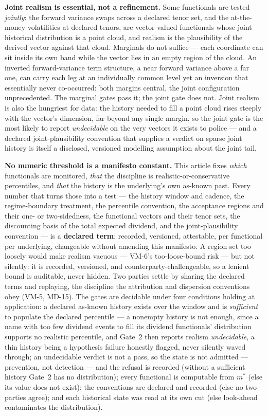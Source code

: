 \documentclass[11pt,a4paper]{article}
\begin{document}
\textbf{Joint realism is essential, not a refinement.} Some functionals are tested
\emph{jointly}: the forward variance swaps across a declared tenor set, and the
at-the-money volatilities at declared tenors, are vector-valued functionals whose
joint historical distribution is a point cloud, and realism is the plausibility of
the derived vector against that cloud. Marginals do not suffice --- each coordinate
can sit inside its own band while the vector lies in an empty region of the cloud.
An inverted forward-variance term structure, a near forward variance above a far
one, can carry each leg at an individually common level yet an inversion that
essentially never co-occurred: both margins central, the joint configuration
unprecedented. The marginal gates pass it; the joint gate does not. Joint realism
is also the hungriest for data: the history needed to fill a point cloud rises
steeply with the vector's dimension, far beyond any single margin, so the joint
gate is the most likely to report \emph{undecidable} on the very vectors it exists
to police --- and a declared joint-plausibility convention that supplies a verdict
on sparse joint history is itself a disclosed, versioned modelling assumption about
the joint tail.

\textbf{No numeric threshold is a manifesto constant.} This article fixes
\emph{which} functionals are monitored, \emph{that} the discipline is
realistic-or-conservative percentiles, and \emph{that} the history is the
underlying's own as-known past. Every number that turns those into a test --- the
history window and cadence, the regime-boundary treatment, the percentile
convention, the acceptance regions and their one- or two-sidedness, the functional
vectors and their tenor sets, the discounting basis of the total expected
dividend, and the joint-plausibility convention --- is a
\textbf{declared term}: recorded, versioned, attestable, per functional per
underlying, changeable without amending this manifesto. A region set too loosely
would make realism vacuous --- VM-6's too-loose-bound risk --- but not silently: it
is recorded, versioned, and counterparty-challengeable, so a lenient bound is
auditable, never hidden. Two parties settle by sharing the declared terms and
replaying, the discipline the attribution and dispersion conventions obey (VM-5, MD-15).
The gates are decidable under four conditions holding at application: a declared
as-known history exists over the window and is \emph{sufficient} to populate the
declared percentile --- a nonempty history is not enough, since a name with too
few dividend events to fill its dividend functionals' distribution supports no
realistic percentile, and Gate~2 then reports realism \emph{undecidable}, a thin
history being a hypothesis failure honestly flagged, never silently waved through;
an undecidable verdict is not a pass, so the state is not admitted --- prevention,
not detection --- and the refusal is recorded (without a sufficient history Gate~2
has no distribution);
every functional is computable from $m^\ast$ (else its value does not exist); the
conventions are declared and recorded (else no two parties agree); and each
historical state was read at its own cut (else look-ahead contaminates the
distribution).
\end{document}
